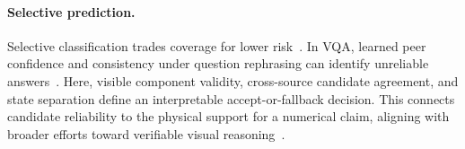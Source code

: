 \paragraph{Selective prediction.}
Selective classification trades coverage for lower risk~\cite{elyaniv2010selective,geifman2017selective}. In VQA, learned peer confidence and consistency under question rephrasing can identify unreliable answers~\cite{dancette2023selectivevqa,khan2024consistency}. Here, visible component validity, cross-source candidate agreement, and state separation define an interpretable accept-or-fallback decision. This connects candidate reliability to the physical support for a numerical claim, aligning with broader efforts toward verifiable visual reasoning~\cite{xu2025vpbench}.
